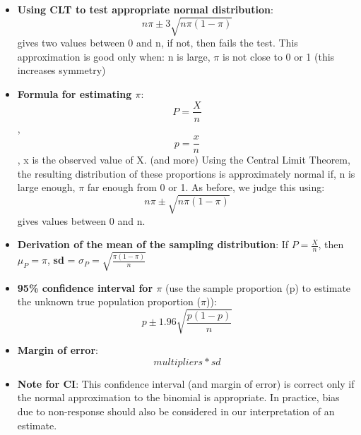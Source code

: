 \documentclass[12pt]{book}
\begin{document}
\begin{itemize}
\item \textbf{Using CLT to test appropriate normal distribution}: $$n\pi \pm 3 \sqrt{n\pi (1 - \pi)}$$
gives two values between 0 and n, if not, then fails the test. This approximation is good only when: n is large, $\pi$ is not close to 0 or 1 (this increases symmetry)
\item \textbf{Formula for estimating $\pi$}: $$P = \frac{X}{n}$$, $$p = \frac{x}{n}$$, x is the observed value of X. (and more) Using the Central Limit Theorem, the resulting distribution of these proportions is approximately normal if, n is large enough, $\pi$ far enough from 0 or 1. As before, we judge this using: $$n\pi \pm \sqrt{n\pi(1 - \pi)}$$ gives values between 0 and n.
\item \textbf{Derivation of the mean of the sampling distribution}: If \(P = \frac{X}{n}\), then \(\mu_P = \pi\), \textbf{sd} = \(\sigma_P = \sqrt{\frac{\pi(1 - \pi)}{n}}\)
\item \textbf{95\% confidence interval for $\pi$} (use the sample proportion (p) to estimate the unknown true population proportion ($\pi$)): $$p \pm 1.96 \sqrt{\frac{p(1 - p)}{n}}$$
\item \textbf{Margin of error}: $$multipliers * sd$$
\item \textbf{Note for CI}: This confidence interval (and margin of error) is correct only if the normal approximation to the binomial is appropriate. In practice, bias due to non-response should also be considered in our interpretation of an estimate.
\end{itemize}

\newpage

\pagestyle{fancy}
\end{document}
